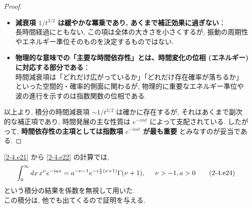 \documentclass[a4paper,12pt]{article}
\begin{document}
\begin{proof}
\begin{itemize}
  \item \textbf{減衰項 $1/t^{3/2}$ は緩やかな冪乗であり, あくまで補正効果に過ぎない}：\\
  長時間経過にともない, この項は全体の大きさを小さくするが, 振動の周期性やエネルギー準位そのものを決定するものではない.

  \item \textbf{物理的な意味での「主要な時間依存性」とは、時間変化の位相 (エネルギー) に対応する部分である}：\\
  時間減衰項は「どれだけ広がっているか」「どれだけ存在確率が落ちるか」といった空間的・確率的側面に関わるが, 物理的に重要なエネルギー準位や波の進行を示すのは指数関数の位相である.
\end{itemize}

以上より, 積分の時間減衰項 $\sim 1/t^{3/2}$ は確かに存在するが, それはあくまで副次的な補正項であり, 時間発展の主な性質は $e^{-imt}$ によって支配されている. したがって, \textbf{時間依存性の主項としては指数項 $e^{-imt}$ が最も重要} とみなすのが妥当である.

\end{proof}
\eqref{2-4.e21} から \eqref{2-4.e22} の計算では,
\begin{equation*}
  \int_{0}^{\infty} dx\, x^{\nu} e^{-iax} = a^{-\nu-1} e^{-i\frac{\pi}{2} (\nu + 1)} \Gamma(\nu+1), \hspace{0.5cm} \nu > -1, a > 0 \label{2-4.e24}\tag{2-4.e24}
\end{equation*}
という積分の結果を係数を無視して用いた.\\ この積分は, 他でも出てくるので証明を与える.
\end{document}
